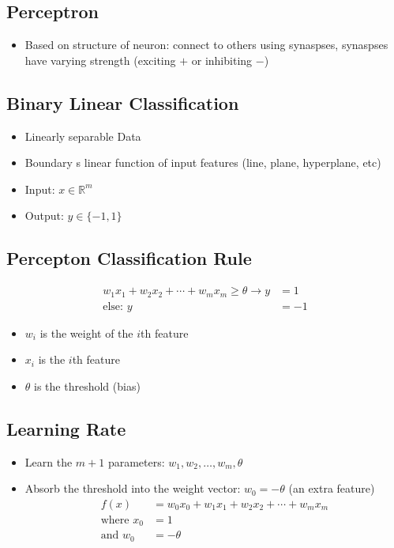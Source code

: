 \documentclass[12pt]{article}
\begin{document}
        \subsection{Perceptron}
            \begin{itemize}
                \item Based on structure of neuron: connect to others using synaspses, synaspses have varying strength (exciting $+$ or inhibiting $-$)
            \end{itemize}
        \subsection{Binary Linear Classification}
            \begin{itemize}
                \item Linearly separable Data
                \item Boundary s linear function of input features (line, plane, hyperplane, etc)
                \item Input: $x \in \mathbb{R}^m$
                \item Output: $y \in \{-1, 1\}$
            \end{itemize}
        \subsection{Percepton Classification Rule}
            \begin{align*}
                w_1{x_1} + w_2{x_2} + \cdots + w_m{x_m} \ge \theta \rightarrow y &= 1 \\
                \text{else: } y &= -1
            \end{align*}
            \begin{itemize}
                \item $w_i$ is the weight of the $i$th feature
                \item $x_i$ is the $i$th feature
                \item $\theta$ is the threshold (bias)
            \end{itemize}
        \subsection{Learning Rate} 
            \begin{itemize}
                \item Learn the $m+1$ parameters: $w_1, w_2, \ldots, w_m, \theta$
                \item Absorb the threshold into the weight vector: $w_0 = -\theta$ (an extra feature)
                \begin{align*}
                    f(x) &= w_0{x_0} + w_1{x_1} + w_2{x_2} + \cdots + w_m{x_m} \\
                    \text{where } x_0 &= 1 \\
                    \text{and } w_0 &= -\theta
                \end{align*}
            \end{itemize}
\end{document}
